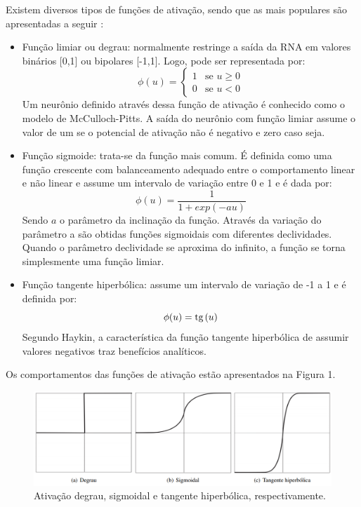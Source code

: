 \documentclass[a4paper,11pt]{article}
\renewcommand{\tan}{\mathrm{tg\hspace{0.5mm}}}  %
\begin{document}
		Existem diversos tipos de funções de ativação, sendo que as mais populares são apresentadas a seguir \cite{RedesNeuraisSimonHaykin}:
		
		\begin{itemize}
			
			\item Função limiar ou degrau: normalmente restringe a saída da RNA em valores binários [0,1] ou bipolares [-1,1]. Logo, pode ser representada por:			
			\begin{equation*}
				\phi(u) = 
				\left \{ \begin{matrix}
					1 & \mbox{se }u \ge 0 \\
					0 & \mbox{se }u < 0
				\end{matrix} \right.
			\end{equation*}			
			Um neurônio definido através dessa função de ativação é conhecido como o modelo de McCulloch-Pitts. A saída do neurônio com função limiar assume o valor de um se o potencial de ativação não é negativo e zero caso seja. 
			
			\item Função sigmoide: trata-se da função mais comum. É definida como uma função crescente com balanceamento adequado entre o comportamento linear e não linear e assume um intervalo de variação entre 0 e 1 e é dada por:			
			\begin{equation*}
				\phi(u) = 
				\frac{1}{1+exp(-au)}
			\end{equation*}			
			Sendo $a$ o parâmetro da inclinação da função. Através da variação do parâmetro a são obtidas funções sigmoidais com diferentes declividades. Quando o parâmetro declividade se aproxima do infinito, a função se torna simplesmente uma função limiar.
			
			\item Função tangente hiperbólica: assume um intervalo de variação de -1 a 1 e é definida por:			
			\begin{equation*}
				\phi(u) = \tan(u)
			\end{equation*}			
			Segundo Haykin, a característica da função tangente hiperbólica de assumir valores negativos traz benefícios analíticos.
			
		\end{itemize}
	
		Os comportamentos das funções de ativação estão apresentados na Figura 1.	 
		\begin{figure}[H]
			\centering
			\includegraphics[width=0.7\linewidth]{Figuras/Figura01}
			\caption[Figura 01]{Ativação degrau, sigmoidal e tangente hiperbólica, respectivamente.}
			\label{fig:Figura 1}
		\end{figure}
		
\end{document}
